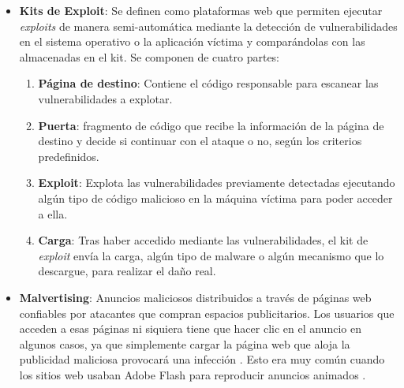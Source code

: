 \begin{itemize}
    \item \textbf{Kits de Exploit}: 
    Se definen como plataformas web que permiten ejecutar \textit{exploits} de manera semi-automática mediante la detección de vulnerabilidades en el sistema operativo o la aplicación víctima y comparándolas con las almacenadas en el kit. Se componen de cuatro partes:
    \begin{enumerate}
        \item \textbf{Página de destino}: Contiene el código responsable para escanear las vulnerabilidades a explotar.
        \item \textbf{Puerta}: fragmento de código que recibe la información de la página de destino y decide si continuar con el ataque o no, según los criterios predefinidos.
        \item \textbf{Exploit}: Explota las vulnerabilidades previamente detectadas ejecutando algún tipo de código malicioso en la máquina víctima para poder acceder a ella.
        \item \textbf{Carga}: Tras haber accedido mediante las vulnerabilidades, el kit de \textit{exploit} envía la carga, algún tipo de malware o algún mecanismo que lo descargue, para realizar el daño real.
    \end{enumerate}
    
    \item \textbf{Malvertising}: Anuncios maliciosos distribuidos a través de páginas web confiables por atacantes que compran espacios publicitarios. Los usuarios que acceden a esas páginas ni siquiera tiene que hacer clic en el anuncio en algunos casos, ya que simplemente cargar la página web que aloja la publicidad maliciosa provocará una infección \cite{44}. Esto era muy común cuando los sitios web usaban Adobe Flash para reproducir anuncios animados \cite{43}.

    

\end{itemize}
